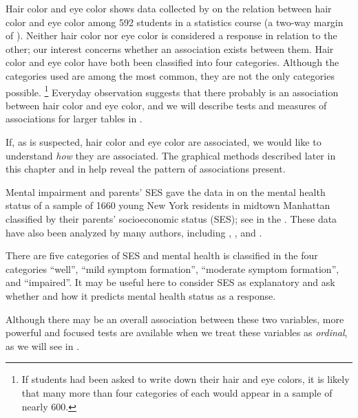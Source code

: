\documentclass[11pt]{book}\usepackage[]{graphicx}\usepackage[]{color}
\begin{document}
\begin{Example}[haireye1]{Hair color and eye color}
 shows data collected by
\citet{Snee:74}
on the relation between hair color and eye color among 592
students in a statistics course
(a two-way margin of ).  Neither hair color nor eye color
is considered a response in relation to the other;  our interest concerns
whether an association exists between them.
Hair color and eye color have both been classified
into four categories.  Although the categories used are among the most
common, they are not the only categories possible.%
\footnote{If students had been asked to write down their hair and eye
colors, it is likely that many more than four categories of each
would appear in a sample of nearly 600.}
Everyday observation suggests that there probably is an association
between hair color and eye color, and we will describe tests
and measures of associations for larger tables in
.

\end{Example}

If, as is suspected, hair color and eye color are associated,
we would like to understand \emph{how} they are associated.
The graphical methods described later in this chapter 
and in  help
reveal the pattern of associations present.


\begin{Example}[mental1]{Mental impairment and parents' SES}
\citet[p. 289]{Srole-etal:78} gave the data 
in  on the mental
health status of a sample of 1660 young New York residents in midtown Manhattan
classified by their parents' socioeconomic status (SES);
see  in the .
These data have also been analyzed by many authors, including
\citet[ \S 10.5.3]{Agresti:2013},
\citet{Goodman:79}, and
\citet[p. 375]{Haberman:79}. 

There are five categories of SES and mental health is classified
in the four categories ``well'', ``mild symptom formation'',
``moderate symptom formation'', and ``impaired''.
It may be useful here to consider SES as explanatory
and ask whether and how it predicts mental health status as
a response.

Although there may be an overall association between these two
variables, more powerful and focused tests are available
when we treat these variables as \emph{ordinal}, as we will see in
.
\end{Example}
\end{document}
